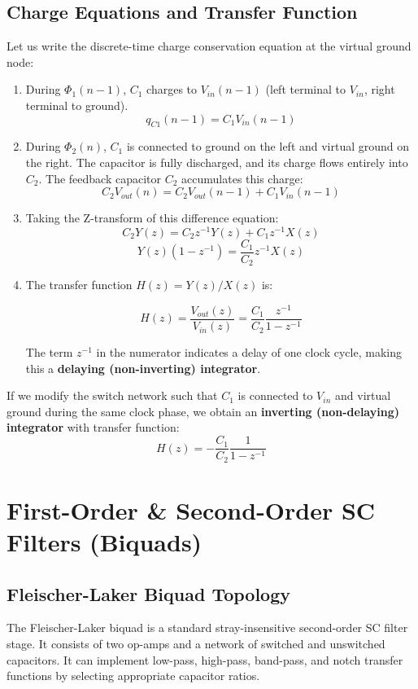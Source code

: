 \documentclass[12pt,a4paper]{article}
\begin{document}
\subsection{Charge Equations and Transfer Function}
Let us write the discrete-time charge conservation equation at the virtual ground node:
\begin{enumerate}[label=\textbf{\arabic*.}, leftmargin=*, itemsep=3pt]
  \item During $\Phi_1(n-1)$, $C_1$ charges to $V_{in}(n-1)$ (left terminal to $V_{in}$, right terminal to ground).
  \[
  q_{C1}(n-1) = C_1 V_{in}(n-1)
  \]
  \item During $\Phi_2(n)$, $C_1$ is connected to ground on the left and virtual ground on the right. The capacitor is fully discharged, and its charge flows entirely into $C_2$. The feedback capacitor $C_2$ accumulates this charge:
  \[
  C_2 V_{out}(n) = C_2 V_{out}(n-1) + C_1 V_{in}(n-1)
  \]
  \item Taking the Z-transform of this difference equation:
  \[
  C_2 Y(z) = C_2 z^{-1} Y(z) + C_1 z^{-1} X(z)
  \]
  \[
  Y(z)(1 - z^{-1}) = \frac{C_1}{C_2} z^{-1} X(z)
  \]
  \item The transfer function $H(z) = Y(z)/X(z)$ is:
  \begin{tcolorbox}[formulabox, title={\textbf{Non-Inverting SC Integrator Transfer Function}}]
  \[
  H(z) = \frac{V_{out}(z)}{V_{in}(z)} = \frac{C_1}{C_2} \frac{z^{-1}}{1 - z^{-1}}
  \]
  \end{tcolorbox}
  The term $z^{-1}$ in the numerator indicates a delay of one clock cycle, making this a \textbf{delaying (non-inverting) integrator}.
\end{enumerate}

If we modify the switch network such that $C_1$ is connected to $V_{in}$ and virtual ground during the same clock phase, we obtain an \textbf{inverting (non-delaying) integrator} with transfer function:
\[
H(z) = -\frac{C_1}{C_2} \frac{1}{1 - z^{-1}}
\]

\section{First-Order \& Second-Order SC Filters (Biquads)}

\subsection{Fleischer-Laker Biquad Topology}
The Fleischer-Laker biquad is a standard stray-insensitive second-order SC filter stage. It consists of two op-amps and a network of switched and unswitched capacitors. It can implement low-pass, high-pass, band-pass, and notch transfer functions by selecting appropriate capacitor ratios.
\end{document}
